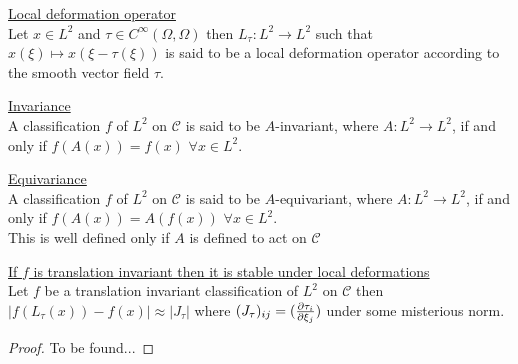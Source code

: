 \documentclass[../main.tex]{subfiles}
\begin{document}
\begin{defn}\underline{Local deformation operator}\\
Let $x \in L^2$ and $\tau \in C^\infty(\Omega,\Omega)$ then $L_\tau:L^2 \to L^2$ such that $x(\xi) \mapsto x(\xi-\tau(\xi))$
is said to be a local deformation operator according to the smooth vector field $\tau$.
\end{defn}

\begin{defn}\underline{Invariance}\\
A classification $f$ of $L^2$ on $\mathcal{C}$ is said to be $A$-invariant, where
$A:L^2 \to L^2$, if and only if $f(A(x))=f(x)$  $\forall x \in L^2$.
\end{defn}

\begin{defn}\underline{Equivariance}\\
A classification $f$ of $L^2$ on $\mathcal{C}$ is said to be $A$-equivariant, where
$A:L^2 \to L^2$, if and only if $f(A(x))=A(f(x))$  $\forall x \in L^2$.\\
This is well defined only if $A$ is defined to act on $\mathcal{C}$
\end{defn}

\begin{prop}\underline{If $f$ is translation invariant then it is stable under local deformations}\\
Let $f$ be a translation invariant classification of $L^2$ on $\mathcal{C}$
then $|f(L_\tau(x))-f(x)|\approx |J_\tau|$ where $(J_\tau)_{ij}=(\frac{\partial \tau_i}{\partial \xi_j})$ under some misterious norm.
\end{prop}
\begin{proof}
To be found...
\end{proof}

\end{document}
